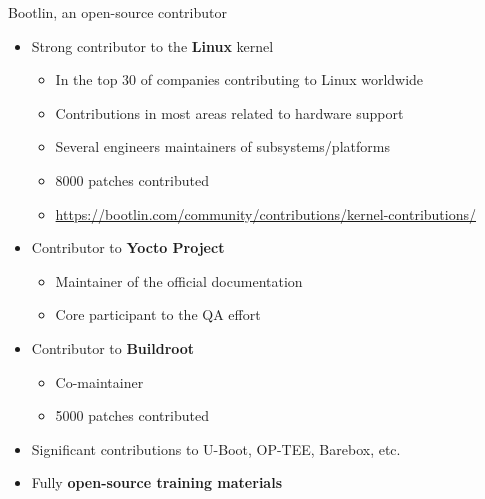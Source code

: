 \begin{frame}{Bootlin, an open-source contributor}
  \begin{itemize}
  \item Strong contributor to the {\bf Linux} kernel
    \begin{itemize}
    \item In the top 30 of companies contributing to Linux worldwide
    \item Contributions in most areas related to hardware support
    \item Several engineers maintainers of subsystems/platforms
    \item 8000 patches contributed
    \item \url{https://bootlin.com/community/contributions/kernel-contributions/}
    \end{itemize}
  \item Contributor to {\bf Yocto Project}
    \begin{itemize}
    \item Maintainer of the official documentation
    \item Core participant to the QA effort
    \end{itemize}
  \item Contributor to {\bf Buildroot}
    \begin{itemize}
    \item Co-maintainer
    \item 5000 patches contributed
    \end{itemize}
  \item Significant contributions to U-Boot, OP-TEE, Barebox, etc.
  \item Fully {\bf open-source training materials}
  \end{itemize}
\end{frame}

